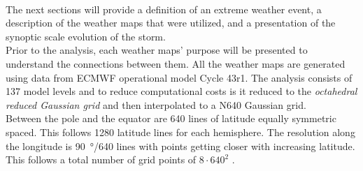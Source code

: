 \\
The next sections will provide a definition of an extreme weather event, a description of the weather maps that were utilized, and a presentation of the synoptic scale evolution of the storm. \\
Prior to the analysis, each weather maps' purpose  will be presented to understand the connections between them. All the weather maps are generated using data from ECMWF operational model Cycle {43r1}. The analysis consists of 137 model levels and to reduce computational costs is it reduced to the \textit{octahedral reduced Gaussian grid} and then interpolated to a N640 Gaussian grid. 
\\
Between the pole and the equator are 640 lines of latitude equally symmetric spaced. This follows 1280 latitude lines for each hemisphere. The resolution along the longitude is \SI{90}{\degree}/640 lines with points getting closer with increasing latitude. This follows a total number of grid points of $8 \cdot 640^2$ \citep{dando_introducing_2016}.



% 




\newpage








